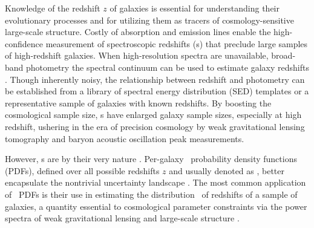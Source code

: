 Knowledge of the redshift $z$ of galaxies is essential for understanding their evolutionary processes and for utilizing them as tracers of cosmology-sensitive large-scale structure.
Costly  of absorption and emission lines enable the high-confidence measurement of spectroscopic redshifts (\sz s) that preclude large samples of high-redshift galaxies.
When high-resolution spectra are unavailable, broad-band photometry  the spectral continuum can be used to estimate galaxy redshifts \citep{baum_photoelectric_1962}.
Though inherently noisy, the relationship between redshift and photometry can be established from a library of spectral energy distribution (SED) templates or a representative sample of galaxies with known redshifts.
By boosting the cosmological sample size, \pz s have enlarged galaxy sample sizes, especially at high redshift, ushering in the era of precision cosmology  by weak gravitational lensing tomography and baryon acoustic oscillation peak measurements.  

However, \pz s are by their very nature .
Per-galaxy \pz\ probability density functions (PDFs), defined over all possible redshifts $z$ and usually denoted as , better encapsulate the nontrivial uncertainty landscape \citep{koo_photometric_1999}.
The most common application of \pz\ PDFs is their use in estimating the distribution \Nz\ of redshifts of a sample of galaxies, a quantity essential to cosmological parameter constraints via the power spectra of weak gravitational lensing and large-scale structure \citep{mandelbaum_precision_2008, sheldon_photometric_2012, bonnett_redshift_2016}.

